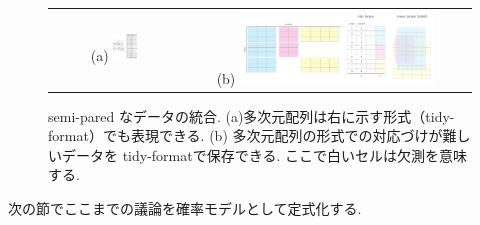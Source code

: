 \documentclass[a4paper,12ptc]{jsarticle} %
\begin{document}
\begin{figure}
    \centering
    \begin{tabular}{c|c}
    \footnotesize (a)
    \includegraphics[width=0.2\textwidth]{img/threeway.pdf} &
    \footnotesize (b)
    \includegraphics[width=0.7\textwidth]{img/mosaic.pdf} 
    \end{tabular}
    \caption{semi-pared なデータの統合. (a)多次元配列は右に示す形式（tidy-format）でも表現できる.  (b) 多次元配列の形式での対応づけが難しいデータを tidy-formatで保存できる. ここで白いセルは欠測を意味する.}
    \label{fig_mosaic}
\end{figure}

次の節でここまでの議論を確率モデルとして定式化する.
\end{document}
